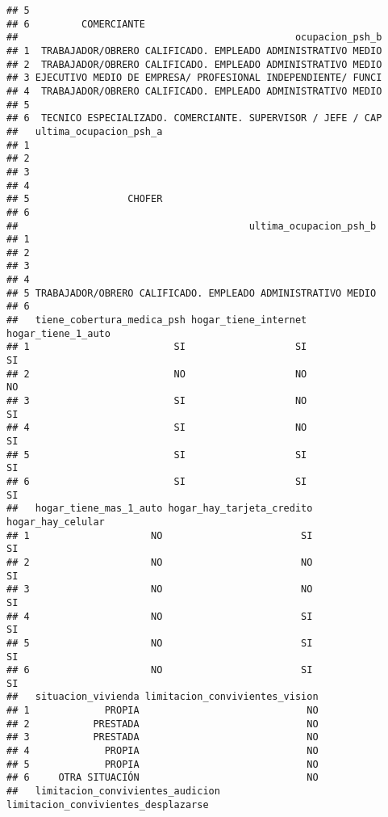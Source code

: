 \documentclass[
]{article}
\begin{document}
\begin{verbatim}
## 5                    
## 6         COMERCIANTE
##                                                ocupacion_psh_b
## 1  TRABAJADOR/OBRERO CALIFICADO. EMPLEADO ADMINISTRATIVO MEDIO
## 2  TRABAJADOR/OBRERO CALIFICADO. EMPLEADO ADMINISTRATIVO MEDIO
## 3 EJECUTIVO MEDIO DE EMPRESA/ PROFESIONAL INDEPENDIENTE/ FUNCI
## 4  TRABAJADOR/OBRERO CALIFICADO. EMPLEADO ADMINISTRATIVO MEDIO
## 5                                                             
## 6  TECNICO ESPECIALIZADO. COMERCIANTE. SUPERVISOR / JEFE / CAP
##   ultima_ocupacion_psh_a
## 1                       
## 2                       
## 3                       
## 4                       
## 5                 CHOFER
## 6                       
##                                        ultima_ocupacion_psh_b
## 1                                                            
## 2                                                            
## 3                                                            
## 4                                                            
## 5 TRABAJADOR/OBRERO CALIFICADO. EMPLEADO ADMINISTRATIVO MEDIO
## 6                                                            
##   tiene_cobertura_medica_psh hogar_tiene_internet hogar_tiene_1_auto
## 1                         SI                   SI                 SI
## 2                         NO                   NO                 NO
## 3                         SI                   NO                 SI
## 4                         SI                   NO                 SI
## 5                         SI                   SI                 SI
## 6                         SI                   SI                 SI
##   hogar_tiene_mas_1_auto hogar_hay_tarjeta_credito hogar_hay_celular
## 1                     NO                        SI                SI
## 2                     NO                        NO                SI
## 3                     NO                        NO                SI
## 4                     NO                        SI                SI
## 5                     NO                        SI                SI
## 6                     NO                        SI                SI
##   situacion_vivienda limitacion_convivientes_vision
## 1             PROPIA                             NO
## 2           PRESTADA                             NO
## 3           PRESTADA                             NO
## 4             PROPIA                             NO
## 5             PROPIA                             NO
## 6     OTRA SITUACIÓN                             NO
##   limitacion_convivientes_audicion limitacion_convivientes_desplazarse

\end{verbatim}
\end{document}
